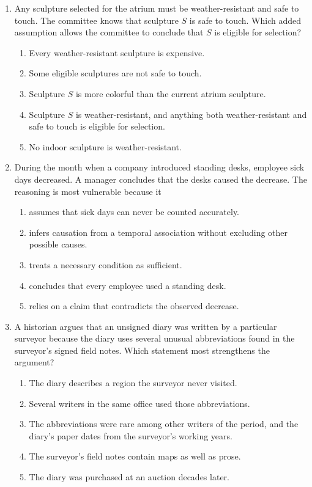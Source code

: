 \begin{enumerate}
\item Any sculpture selected for the atrium must be weather-resistant and safe
to touch. The committee knows that sculpture $S$ is safe to touch. Which added
assumption allows the committee to conclude that $S$ is eligible for selection?
  \begin{enumerate}
  \item Every weather-resistant sculpture is expensive.
  \item Some eligible sculptures are not safe to touch.
  \item Sculpture $S$ is more colorful than the current atrium sculpture.
  \item Sculpture $S$ is weather-resistant, and anything both weather-resistant
        and safe to touch is eligible for selection.
  \item No indoor sculpture is weather-resistant.
  \end{enumerate}

\item During the month when a company introduced standing desks, employee sick
days decreased. A manager concludes that the desks caused the decrease. The
reasoning is most vulnerable because it
  \begin{enumerate}
  \item assumes that sick days can never be counted accurately.
  \item infers causation from a temporal association without excluding other
        possible causes.
  \item treats a necessary condition as sufficient.
  \item concludes that every employee used a standing desk.
  \item relies on a claim that contradicts the observed decrease.
  \end{enumerate}

\item A historian argues that an unsigned diary was written by a particular
surveyor because the diary uses several unusual abbreviations found in the
surveyor's signed field notes. Which statement most strengthens the argument?
  \begin{enumerate}
  \item The diary describes a region the surveyor never visited.
  \item Several writers in the same office used those abbreviations.
  \item The abbreviations were rare among other writers of the period, and the
        diary's paper dates from the surveyor's working years.
  \item The surveyor's field notes contain maps as well as prose.
  \item The diary was purchased at an auction decades later.
  \end{enumerate}


\end{enumerate}
